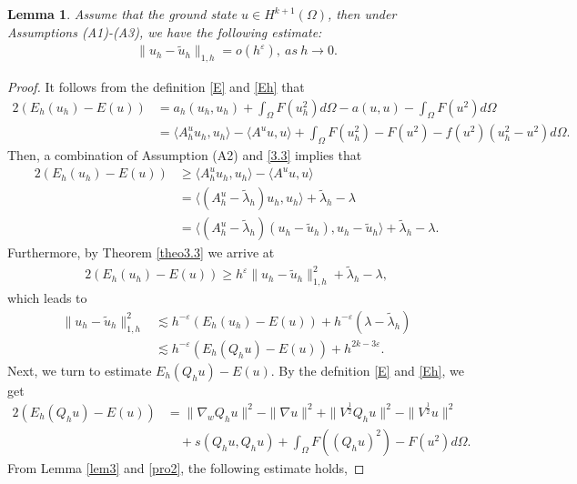 \documentclass[compress, preprint,9pt]{elsarticle}
\numberwithin{equation}{section}
\newtheorem{lemma}{Lemma}[section]
\newcommand{\eps}{\varepsilon}
\newcommand{\la}{\langle}
\newcommand{\ran}{\rangle}
\begin{document}
\begin{lemma}\label{theo4}
	Assume that the ground state $u\in H^{k+1}(\Omega)$, then under Assumptions (A1)-(A3), we have the following estimate:
	\begin{eqnarray*}
		\|u_h-\widetilde{u}_h\|_{1,h}=o(h^\eps),~as~h\rightarrow0.
	\end{eqnarray*}
\end{lemma}
\begin{proof}
	It follows from the definition \eqref{E} and \eqref{Eh} that
	\begin{eqnarray*}
		2(E_h(u_h)-E(u))&=a_h(u_h,u_h)+\int_\Omega F(u_h^2) d\Omega-a(u,u)-\int_\Omega F(u^2) d\Omega\\
		&=\la A_h^u u_h,u_h\ran -\la A^uu,u\ran+\int_\Omega F(u_h^2)-F(u^2)-f(u^2)(u_h^2-u^2) d\Omega.
	\end{eqnarray*}
	Then, a combination of Assumption (A2) and \eqref{3.3} implies that
	\begin{eqnarray*}
		2(E_h(u_h)-E(u))&\ge \la A_h^u u_h,u_h\ran -\la A^uu,u\ran\\
		&=\la (A_h^u-\widetilde{\lambda}_h) u_h,u_h\ran+\widetilde{\lambda}_h-\lambda\\
		&=\la (A_h^u-\widetilde{\lambda}_h) (u_h-\widetilde{u}_h),u_h-\widetilde{u}_h\ran+\widetilde{\lambda}_h-\lambda.
	\end{eqnarray*}
	Furthermore, by Theorem \ref{theo3.3} we arrive at
	\begin{eqnarray*}
		2(E_h(u_h)-E(u))\ge h^\eps\|u_h-\widetilde{u}_h\|_{1,h}^2+\widetilde{\lambda}_h-\lambda,
	\end{eqnarray*}
	which leads to
	\begin{eqnarray*}
		\|u_h-\widetilde{u}_h\|_{1,h}^2&\lesssim h^{-\eps}(E_h(u_h)-E(u))+h^{-\eps}(\lambda-\widetilde{\lambda}_h)\\
		&\lesssim h^{-\eps}(E_h(Q_hu)-E(u))+h^{2k-3\eps}.
	\end{eqnarray*}
	Next, we turn to estimate $E_h(Q_hu)-E(u)$. By the defnition \eqref{E} and \eqref{Eh}, we get
	\begin{equation}\label{3.14}
		\begin{aligned}
			2(E_h(Q_hu)-E(u))&=\|\nabla_wQ_hu\|^2-\|\nabla u\|^2+\|V^\frac{1}{2} Q_hu\|^2-\|V^\frac{1}{2} u\|^2\\
			&\quad+s(Q_hu,Q_hu)+\int_\Omega F((Q_hu)^2)-F(u^2)d\Omega.
		\end{aligned}
	\end{equation}
	From Lemma \ref{lem3} and \eqref{pro2}, the following estimate holds,

\end{proof}
\end{document}
